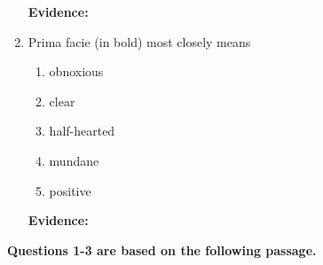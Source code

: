 \begin{enumerate}
\bigskip
\textbf{Evidence:} \hrulefill

\bigskip
\item Prima facie (in bold) most closely means

\begin{enumerate}[label=(\Alph*)]
\item obnoxious
\item clear
\item half-hearted
\item mundane
\item positive
\end{enumerate}

\bigskip
\textbf{Evidence:} \hrulefill

\end{enumerate}

\textbf{Questions 1-3 are based on the following passage.}

